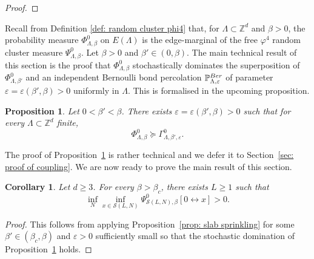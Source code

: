 \documentclass[11pt,a4paper]{article}
\newtheorem{proposition}[theorem]{Proposition}
\newtheorem{corollary}[theorem]{Corollary}
\theoremstyle{definition}
\numberwithin{equation}{section}
\begin{document}
\begin{proof}
\end{proof}


Recall from Definition \ref{def: random cluster phi4} that, for $\Lambda \subset \mathbb Z^d$ and $\beta > 0$, the probability measure $\Phi^0_{\Lambda,\beta}$ on $E(\Lambda)$ is the edge-marginal of the free $\varphi^4$ random cluster measure $\Psi^0_{\Lambda,\beta}$.
Let $\beta>0$ and $\beta' \in (0,\beta)$. The main technical result of this section is the proof that $\Phi^0_{\Lambda,\beta}$ stochastically dominates the superposition of $\Phi^0_{\Lambda,\beta'}$ and an independent Bernoulli bond percolation $\mathbb P^{\rm Ber}_{\Lambda,\varepsilon}$ of parameter $\varepsilon=\varepsilon(\beta',\beta)>0$ uniformly in $\Lambda$. This is formalised in the upcoming proposition. 

\begin{proposition}\label{prop: coupling}
Let $0< \beta'<\beta$. There exists $\varepsilon=\varepsilon(\beta',\beta)>0$ such that for every $\Lambda\subset \mathbb{Z}^d$ finite, 
\begin{equation}
\Phi^0_{\Lambda,\beta}\succcurlyeq \Gamma^{0}_{\Lambda,\beta',\varepsilon}. 
\end{equation}
\end{proposition}


The proof of Proposition~\ref{prop: coupling} is rather technical and we defer it to Section~\ref{sec: proof of coupling}. We are now ready to prove the main result of this section.

\begin{corollary}\label{cor: slab percolation without sprinkling}
Let $d\geq 3$. For every $\beta>\beta_c$, there exists $L\geq 1$ such that
\begin{equation}\label{eq: slab percolation without sprinkling}
        \inf_{N}\inf_{x\in \mathcal{S}(L,N)} \Psi^0_{\mathcal{S}(L,N),\beta} [0\longleftrightarrow x]>0.
\end{equation}
\end{corollary}
\begin{proof}
This follows from applying Proposition~\ref{prop: slab sprinkling} for some $\beta'\in (\beta_c,\beta)$ and $\varepsilon>0$ sufficiently small so that the stochastic domination of Proposition~\ref{prop: coupling} holds.    
\end{proof}


\end{document}
